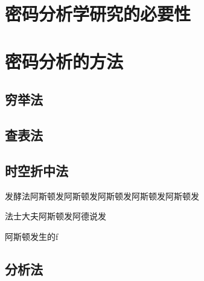 \section{密码分析学研究的必要性}
\section{密码分析的方法}
\subsection{穷举法}
\subsection{查表法}
\subsection{时空折中法}
{发酵法阿斯顿发阿斯顿发阿斯顿发阿斯顿发阿斯顿发

法士大夫阿斯顿发阿德说发

阿斯顿发生的f}
\subsection{分析法}
